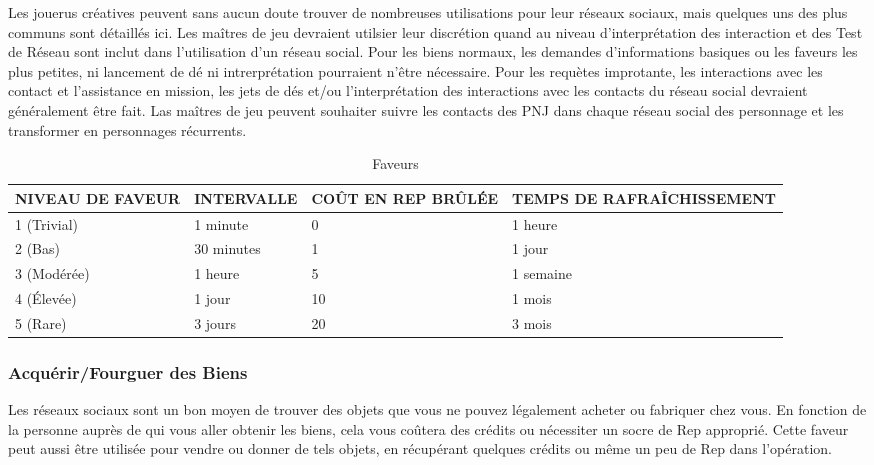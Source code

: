 Les jouerus créatives peuvent sans aucun doute trouver de nombreuses utilisations pour leur réseaux sociaux, mais quelques uns des plus communs sont détaillés ici. Les maîtres de jeu devraient utilsier leur discrétion quand au niveau d'interprétation des interaction et des Test de Réseau sont inclut dans l'utilisation d'un réseau social. Pour les biens normaux, les demandes d'informations basiques ou les faveurs les plus petites, ni lancement de dé ni intrerprétation pourraient n'être nécessaire. Pour les requètes improtante, les interactions avec les contact et l'assistance en mission, les jets de dés et/ou l'interprétation des interactions avec les contacts du réseau social devraient généralement être fait. Las maîtres de jeu peuvent souhaiter suivre les contacts des PNJ dans chaque réseau social des personnage et les transformer en personnages récurrents. 

\begin{table} \caption{Faveurs} \begin{tabular}{|l|l|l|l|} \hline

NIVEAU DE FAVEUR &INTERVALLE &COÛT EN REP BRÛLÉE &TEMPS DE RAFRAÎCHISSEMENT\\ \hline

1 (Trivial) &1 minute &0 &1 heure \\ \hline

2 (Bas) &30 minutes &1 &1 jour \\ \hline

3 (Modérée) &1 heure &5 &1 semaine\\ \hline

4 (Élevée) &1 jour &10 &1 mois \\ \hline

5 (Rare) &3 jours &20 &3 mois \\ \hline

\end{tabular} \end{table} 



\subsubsection{Acquérir/Fourguer des Biens} 

Les réseaux sociaux sont un bon moyen de trouver des objets que vous ne pouvez légalement acheter ou fabriquer chez vous. En fonction de la personne auprès de qui vous aller obtenir les biens, cela vous coûtera des crédits ou nécessiter un socre de Rep approprié. Cette faveur peut aussi être utilisée pour vendre ou donner de tels objets, en récupérant quelques crédits ou même un peu de Rep dans l'opération. 

